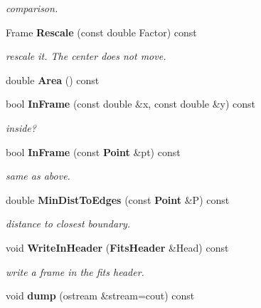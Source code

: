 \begin{CompactItemize}
\begin{CompactList}\small\item\em comparison.\item\end{CompactList}\item 
{}
Frame {\bf Rescale} (const double Factor) const\label{class_frame_a17}

\begin{CompactList}\small\item\em rescale it. The center does not move.\item\end{CompactList}\item 
{}
double {\bf Area} () const\label{class_frame_a18}

\item 
{}
bool {\bf In\-Frame} (const double \&x, const double \&y) const\label{class_frame_a19}

\begin{CompactList}\small\item\em inside?\item\end{CompactList}\item 
{}
bool {\bf In\-Frame} (const {\bf Point} \&pt) const\label{class_frame_a20}

\begin{CompactList}\small\item\em same as above.\item\end{CompactList}\item 
{}
double {\bf Min\-Dist\-To\-Edges} (const {\bf Point} \&P) const\label{class_frame_a21}

\begin{CompactList}\small\item\em distance to closest boundary.\item\end{CompactList}\item 
{}
void {\bf Write\-In\-Header} ({\bf Fits\-Header} \&Head) const\label{class_frame_a22}

\begin{CompactList}\small\item\em write a frame in the fits header.\item\end{CompactList}\item 
{}
void {\bf dump} (ostream \&stream=cout) const\label{class_frame_a23}

\end{CompactItemize}
